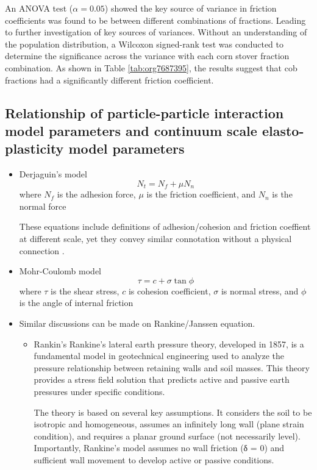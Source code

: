 \documentclass[xcolor=dvipsnames,10pt,hidelinks]{article}
\let\oldsubsection\subsection
\renewcommand{\subsection}{\clearpage\oldsubsection}
\begin{document}
An ANOVA test (\(\alpha = 0.05\)) showed the key source of variance in friction coefficients was found to be between different combinations of fractions. Leading to further investigation of key sources of variances.
Without an understanding of the population distribution, a Wilcoxon signed-rank test was conducted to determine the significance across the variance with each corn stover fraction combination.
As shown in Table \ref{tab:org7687395}, the results suggest that cob fractions had a significantly different friction coefficient.
\subsection{Relationship of particle-particle interaction model parameters and continuum scale elasto-plasticity model parameters}
\label{sec:org995ed69}
\begin{itemize}
\item Derjaguin's model
\label{sec:org672a90c}
\begin{equation}
  \label{eq:Derjaguin}
 N_t =  N_f + \mu N_n
\end{equation}
where \(N_f\) is the adhesion force, \(\mu\) is the friction coefficient, and \(N_n\) is the normal force

These equations include definitions of adhesion/cohesion and friction coeffient at different scale, yet they convey similar connotation without a physical connection  \parencite{reynolds_lvii_1885}.
\item Mohr-Coulomb model
\label{sec:orga22b09e}
\begin{equation}
  \label{eq:mc}
  \tau = c + \sigma\tan\phi
\end{equation}
where \(\tau\) is the shear stress, \(c\) is cohesion coefficient, \(\sigma\) is normal stress, and \(\phi\) is the angle of internal friction
\item Similar discussions can be made on Rankine/Janssen equation.
\label{sec:org8870b99}

\begin{itemize}
\item Rankin's
Rankine's lateral earth pressure theory, developed in 1857, is a fundamental model in geotechnical engineering used to analyze the pressure relationship between retaining walls and soil masses. This theory provides a stress field solution that predicts active and passive earth pressures under specific conditions.

The theory is based on several key assumptions. It considers the soil to be isotropic and homogeneous, assumes an infinitely long wall (plane strain condition), and requires a planar ground surface (not necessarily level). Importantly, Rankine's model assumes no wall friction (δ = 0) and sufficient wall movement to develop active or passive conditions.


\end{itemize}
\end{itemize}
\end{document}
